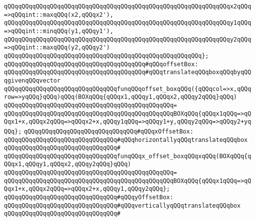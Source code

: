 \verb|qQQqqQQqqQQqqQQqqQQqqQQqqQQqqQQqqQQqqQQqqQQqqQQqqQQqqQQqqQQqqQQqx2qQQq=>qQQqint::maxqQQq(x2,qQQqx2'),|\newline
\verb|qQQqqQQqqQQqqQQqqQQqqQQqqQQqqQQqqQQqqQQqqQQqqQQqqQQqqQQqqQQqqQQqy1qQQq=>qQQqint::minqQQq(y1,qQQqy1'),|\newline
\verb|qQQqqQQqqQQqqQQqqQQqqQQqqQQqqQQqqQQqqQQqqQQqqQQqqQQqqQQqqQQqqQQqy2qQQq=>qQQqint::maxqQQq(y2,qQQqy2')|\newline
\verb|qQQqqQQqqQQqqQQqqQQqqQQqqQQqqQQqqQQqqQQqqQQqqQQqqQQqqQQq};|\newline
\newline
\verb|qQQqqQQqqQQqqQQqqQQqqQQqqQQqqQQqqQQqqQQq#qQQqoffsetBox:|\newline
\verb|qQQqqQQqqQQqqQQqqQQqqQQqqQQqqQQqqQQqqQQq#qQQqtranslateqQQqboxqQQqbyqQQqgivenqQQqvector|\newline
\newline
\verb|qQQqqQQqqQQqqQQqqQQqqQQqqQQqqQQqfunqQQqoffset_boxqQQq({qQQqcol=>x,qQQqrow=>yqQQq}qQQq)qQQq(BOXqQQq{qQQqx1,qQQqy1,qQQqx2,qQQqy2qQQq}qQQq)|\newline
\verb|qQQqqQQqqQQqqQQqqQQqqQQqqQQqqQQqqQQqqQQqqQQqqQQq=|\newline
\verb|qQQqqQQqqQQqqQQqqQQqqQQqqQQqqQQqqQQqqQQqqQQqqQQqBOXqQQq{qQQqx1qQQq=>qQQqx1+x,qQQqx2qQQq=>qQQqx2+x,qQQqy1qQQq=>qQQqy1+y,qQQqy2qQQq=>qQQqy2+yqQQq};|\newline
\newline
\verb|qQQqqQQqqQQqqQQqqQQqqQQqqQQqqQQq#qQQqxOffsetBox:|\newline
\verb|qQQqqQQqqQQqqQQqqQQqqQQqqQQqqQQq#qQQqhorizontallyqQQqtranslateqQQqbox|\newline
\verb|qQQqqQQqqQQqqQQqqQQqqQQqqQQqqQQq#|\newline
\verb|qQQqqQQqqQQqqQQqqQQqqQQqqQQqqQQqfunqQQqx_offset_boxqQQqxqQQq(BOXqQQq{qQQqx1,qQQqy1,qQQqx2,qQQqy2qQQq}qQQq)|\newline
\verb|qQQqqQQqqQQqqQQqqQQqqQQqqQQqqQQqqQQqqQQqqQQqqQQq=|\newline
\verb|qQQqqQQqqQQqqQQqqQQqqQQqqQQqqQQqqQQqqQQqqQQqqQQqBOXqQQq{qQQqx1qQQq=>qQQqx1+x,qQQqx2qQQq=>qQQqx2+x,qQQqy1,qQQqy2qQQq};|\newline
\newline
\verb|qQQqqQQqqQQqqQQqqQQqqQQqqQQqqQQq#qQQqyOffsetBox:|\newline
\verb|qQQqqQQqqQQqqQQqqQQqqQQqqQQqqQQq#qQQqverticallyqQQqtranslateqQQqbox|\newline
\verb|qQQqqQQqqQQqqQQqqQQqqQQqqQQqqQQq#|\newline
